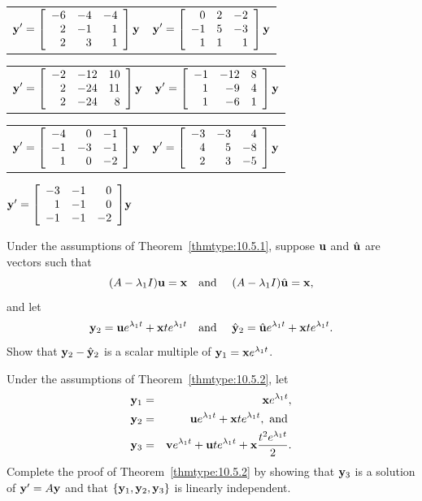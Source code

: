 \begin{exerciselist}
  \begin{tabular}[t]{@{}p{168pt}@{}p{168pt}}
    \item\label{exer:10.5.26} $\displaystyle{{\bf y}' =\left[\begin{array}{rrr} -6&-4&-4\\2&-1&1\\2&3&1\end{array}\right]{\bf y}}$ &
    \item\label{exer:10.5.27} $\displaystyle{{\bf y}' =\left[\begin{array}{rrr} 0&2&-2\\-1&5&-3\\1&1&1\end{array}\right]{\bf y}}$
  \end{tabular}

  \begin{tabular}[t]{@{}p{168pt}@{}p{168pt}}
    \item\label{exer:10.5.28} $\displaystyle{{\bf y}' =\left[\begin{array}{rrr} -2&-12&10\\2&-24&11\\2&-24&8\end{array}\right]{\bf y}}$ &
    \item\label{exer:10.5.29} $\displaystyle{{\bf y}' =\left[\begin{array}{rrr} -1&-12&8\\1&-9&4\\1&-6&1\end{array}\right]{\bf y}}$
  \end{tabular}

  \begin{tabular}[t]{@{}p{168pt}@{}p{168pt}}
    \item\label{exer:10.5.30} $\displaystyle{{\bf y}' =\left[\begin{array}{rrr} -4&0&-1\\-1&-3&-1\\1&0&-2\end{array}\right]{\bf y}}$ &
    \item\label{exer:10.5.31} $\displaystyle{{\bf y}' =\left[\begin{array}{rrr} -3&-3&4\\4&5&-8\\2&3&-5\end{array}\right]\bf y}$
  \end{tabular}

  \item\label{exer:10.5.32} ${\bf y}'={\left[\begin{array}{rrr} -3&-1&0\\1&-1&0\\-1&-1&-2\end{array}\right]}{\bf y}$

  \item\label{exer:10.5.33} Under the assumptions of Theorem~\ref{thmtype:10.5.1}, suppose ${\bf u}$
        and $\hat{\bf u}$ are vectors such that
  \[
    (A-\lambda_{1}I){\bf u}={\bf x}\quad\mbox{and }\quad (A-\lambda_{1}I)\hat{\bf u}={\bf x},
  \]
  and let
  \[
    {\bf y}_{2}={\bf u}e^{\lambda_{1}t}+{\bf x}te^{\lambda_{1}t}\quad\mbox{and }\quad \hat{\bf y}_{2}=\hat{\bf u}e^{\lambda_{1}t}+{\bf x}te^{\lambda_{1}t}.
  \]
  Show that ${\bf y}_{2}-\hat{\bf y}_{2}$ is a scalar multiple of
  ${\bf y}_{1}={\bf x}e^{\lambda_{1}t}$.

  \item\label{exer:10.5.34} Under the assumptions of Theorem~\ref{thmtype:10.5.2}, let
  \begin{eqnarray*}
    {\bf y}_{1} & = & {\bf x}e^{\lambda_{1}t},                                      \\
    {\bf y}_{2} & = & {\bf u}e^{\lambda_{1}t}+{\bf x}te^{\lambda_{1}t},\mbox{ and } \\
    {\bf y}_{3} & = & {\bf v}e^{\lambda_{1}t}+{\bf u}te^{\lambda_{1}t}+{\bf x}{\frac{t^{2}e^{\lambda_{1}t}}{2}}.
  \end{eqnarray*}
  Complete the proof of Theorem~\ref{thmtype:10.5.2} by showing that ${\bf y}_{3}$ is a solution of
  ${\bf y}'=A{\bf y}$ and that $\{{\bf y}_{1},{\bf y}_{2},{\bf y}_{3}\}$ is linearly independent.


\end{exerciselist}
